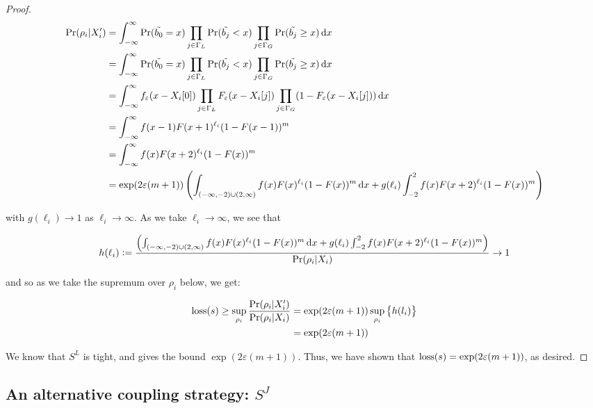 \documentclass{article}
\renewcommand{\epsilon}{\varepsilon}
\newcommand{\loss}{\textup{loss}}
\begin{document}
\begin{proof}
    \begin{align*}
        \Pr(\rho_i | X_i') &= \int_{-\infty}^\infty \Pr(\tilde{b_0} = x) \prod_{j \in \Gamma_L} \Pr(\tilde{b_j} < x) \prod_{j \in \Gamma_G} \Pr(\tilde{b_j} \geq x) \dif x\\
        &= \int_{-\infty}^\infty \Pr(\tilde{b_0} = x) \prod_{j \in \Gamma_L} \Pr(\tilde{b_j} < x) \prod_{j \in \Gamma_G} \Pr(\tilde{b_j} \geq x) \dif x\\
        &= \int_{-\infty}^\infty f_\epsilon(x - X_i[0]) \prod_{j \in \Gamma_L} F_\epsilon(x - X_i[j]) \prod_{j \in \Gamma_G} (1 - F_\epsilon(x - X_i[j])) \dif x\\
        &= \int_{-\infty}^\infty f(x - 1) F(x + 1)^{\ell_i}  (1 - F(x - 1))^m \\
        &= \int_{-\infty}^\infty f(x) F(x + 2)^{\ell_i}  (1 - F(x))^m \\
        &= \exp(2\epsilon (m + 1) )\left(\int_{(-\infty, -2) \cup (2, \infty)} f(x) F(x)^{\ell_i}  (1 - F(x))^m \dif x + g(\ell_i) \int_{-2}^2 f(x) F(x + 2)^{\ell_i}  (1 - F(x))^m\right)
    \end{align*}

    with $g(\ell_i) \to 1$ as $\ell_i \to \infty$. As we take $\ell_i \to \infty$, we see that 

    \begin{align*}
        h(\ell_i) := \frac{\left(\int_{(-\infty, -2) \cup (2, \infty)} f(x) F(x)^{\ell_i}  (1 - F(x))^m \dif x + g(\ell_i) \int_{-2}^2 f(x) F(x + 2)^{\ell_i}  (1 - F(x))^m\right)}{\Pr(\rho_i | X_i)} \to 1
    \end{align*}

    and so as we take the supremum over $\rho_i$ below, we get: 

    \begin{align*}
        \loss(s) \geq \sup_{\rho_i} \frac{\Pr(\rho_i | X_i')}{\Pr(\rho_i | X_i)} &= \exp(2\epsilon(m + 1)) \sup_{\rho_i} \left\{ h(l_i) \right\}\\
        &= \exp(2\epsilon(m + 1))
    \end{align*}

    We know that $S^L$ is tight, and gives the bound $\exp(2\epsilon(m + 1))$. Thus, we have shown that $\loss(s) = \exp(2\epsilon(m + 1))$, as desired.
\end{proof}

\subsection{An alternative coupling strategy: $S^J$}
\end{document}
